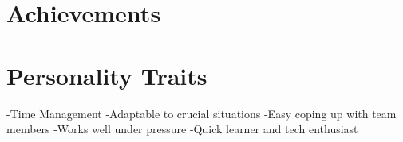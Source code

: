 \documentclass[letterpaper]{twentysecondcv} %
\begin{document}





\section{Achievements}

\begin{twentyshort} %
\end{twentyshort}



\section{Personality Traits}

-Time Management
\newline-Adaptable to crucial situations
\newline-Easy coping up with team members
\newline-Works well under pressure
\newline-Quick learner and tech enthusiast



%
%
%
%

\end{document}
